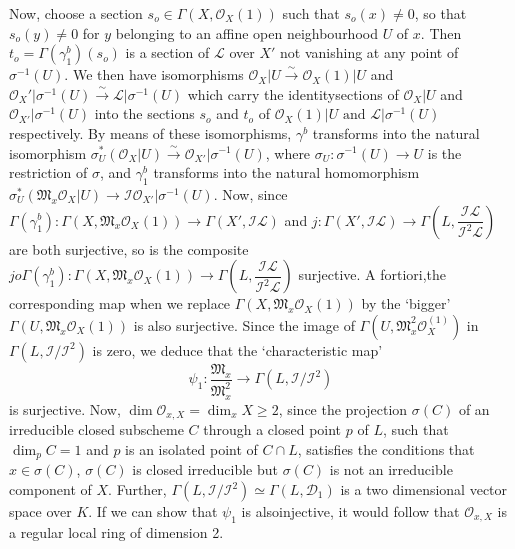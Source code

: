  Now, choose  a section $s_o \in \Gamma (X, \mathscr{O}_X(1))$ such
 that $s_o(x) \neq 0$, so that $s_o(y) \neq 0$ for $y$ belonging to an
 affine open neighbourhood $U$ of $x$. Then $t_o=\Gamma (
 \gamma^b_1)(s_o)$ is a section of $\mathscr{L}$ over $X'$ not vanishing
 at any point of $\sigma^{-1}(U)$. We then have isomorphisms
 $\mathscr{O}_X \Big| U \overset{\sim}\rightarrow \mathscr{O}_X(1)
 \Big|  U $ and  $\mathscr{O}_X' \Big| \sigma^{-1} (U)
 \overset{\sim}\rightarrow \mathscr{L} \Big|\sigma^{-1}(U)$ which
 carry the identity\pageoriginale sections of $\mathscr{O}_X \Big| U $ and
 $\mathscr{O}_{X'} \big|\sigma^{-1}(U)$ into the sections $s_o$ and
 $t_o$ of $\mathscr{O}_X(1) \Big| U \text { and } \mathscr{L} 
 \bigg | \sigma^{-1}(U)$ respectively. By means of these isomorphisms,
 $\gamma^b$ transforms into the natural isomorphism $\sigma^{*}_U(
 \mathscr{O}_X \Big| U) \overset{\sim}\rightarrow \mathscr{O}_{X'}
 \Big| \sigma^{-1}(U)$, where  $\sigma_U: \sigma^{-1}(U) \rightarrow
 U$ is the restriction of $\sigma$, and $\gamma^b_1$ transforms into
 the natural homomorphism $\sigma^{*}_U( \mathfrak{M}_x \mathscr{O}_X
 \Big| U) \rightarrow \mathscr{I} \mathscr{O}_{X'}
 \Big|\sigma^{-1} (U)$. Now, since $\Gamma (\gamma^b_1) : \Gamma (X,
 \mathfrak{M}_x \mathscr{O}_X (1)) \to \Gamma (X' , \mathscr{I}
 \mathscr{L})$ and $j: \Gamma (X', \mathscr{I}
 \mathscr{L}) \rightarrow \Gamma \left(L ,
 \dfrac{\mathscr{I}\mathscr{L}}{\mathscr{I}^2 \mathscr{L}}\right)$ are both
 surjective, so is the composite $j o \Gamma (\gamma^b_1):\Gamma \left(X,
 \mathfrak{M}_x \mathscr{O}_X (1)\right) \rightarrow \Gamma \left(L,
 \dfrac{\mathscr{I} \mathscr{L}}{\mathscr{I}^2 \mathscr{L}}\right)$
 surjective. A fortiori,the corresponding map when we replace $\Gamma
 (X, \mathfrak{M}_x \mathscr{O}_X (1))$ by the `bigger' $\Gamma \left(U ,
 \mathfrak{M}_x \mathscr{O}_X (1)\right)$ is also surjective. Since the image
 of $\Gamma \left(U, \mathfrak{M}^2_x \mathscr{O}^{(1)}_X\right)$ in $\Gamma (L,
 \mathscr{I}/ \mathscr{I}^2 )$ is zero, we deduce that the
 `characteristic map' 
 $$ 
 \psi_1: \frac{\mathfrak{M}_x}{\mathfrak{M}^2_x} \rightarrow \Gamma(L,
 \mathscr{I} / \mathscr{I}^2) 
 $$   
 is surjective. Now, $\dim \mathscr{O}_{x,X}=\dim_x X \ge 2$, since the
 projection $\sigma (C)$ of an irreducible closed subscheme $C$
 through a closed point $p$ of $L$, such that  $\dim_p C=1$ and $p$
 is an isolated point  of $C \cap L$, satisfies the conditions that $x
 \in \sigma (C)$, $\sigma (C)$ is closed irreducible but $\sigma(C)$ is not an
 irreducible component of $X$. Further, $\Gamma (L, \mathscr{I}/
 \mathscr{I}^2) \simeq \Gamma (L , \mathscr{D}_1)$ is a two
 dimensional vector space over $K$. If we can show that $\psi_1$ is
 also\pageoriginale injective, it would follow that
 $\mathscr{O}_{x,X}$ is a regular  local ring of dimension 2.  
 
